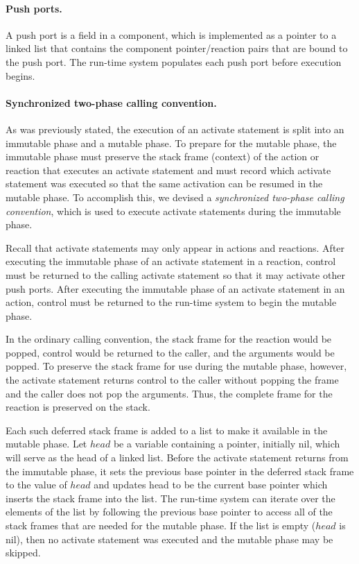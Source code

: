 \paragraph{Push ports.}
A push port is a field in a component, which is implemented as a pointer to a linked list that contains the component pointer/reaction pairs that are bound to the push port.
The \rcgo{} run-time system populates each push port before execution begins.

\paragraph{Synchronized two-phase calling convention.}
As was previously stated, the execution of an activate statement is split into an immutable phase and a mutable phase.
To prepare for the mutable phase, the immutable phase must preserve the stack frame (context) of the action or reaction that executes an activate statement and must record which activate statement was executed so that the same activation can be resumed in the mutable phase.
To accomplish this, we devised a \emph{synchronized two-phase calling convention}, which is used to execute activate statements during the immutable phase.

Recall that activate statements may only appear in actions and reactions.
After executing the immutable phase of an activate statement in a reaction, control must be returned to the calling activate statement so that it may activate other push ports.
After executing the immutable phase of an activate statement in an action, control must be returned to the \rcgo{} run-time system to begin the mutable phase.

In the ordinary calling convention, the stack frame for the reaction would be popped, control would be returned to the caller, and the arguments would be popped.
To preserve the stack frame for use during the mutable phase, however, the activate statement returns control to the caller without popping the frame and the caller does not pop the arguments.
Thus, the complete frame for the reaction is preserved on the stack.

Each such deferred stack frame is added to a list to make it available in the mutable phase.
Let $head$ be a variable containing a pointer, initially nil, which will serve as the head of a linked list.
Before the activate statement returns from the immutable phase, it sets the previous base pointer in the deferred stack frame to the value of $head$ and updates head to be the current base pointer which inserts the stack frame into the list.
The \rcgo{} run-time system can iterate over the elements of the list by following the previous base pointer to access all of the stack frames that are needed for the mutable phase.
If the list is empty ($head$ is nil), then no activate statement was executed and the mutable phase may be skipped.

